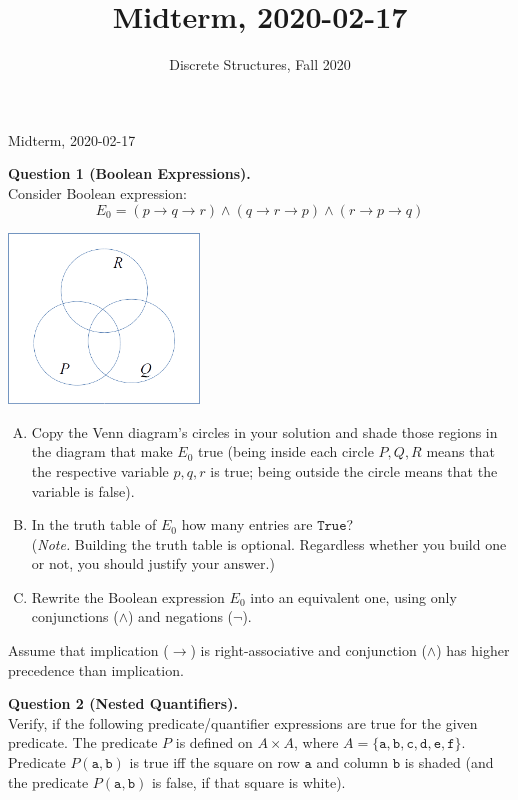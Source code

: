 \documentclass[jou]{apa6}
\title{Midterm, 2020-02-17}
\author{Discrete Structures, Fall 2020}
\affiliation{RBS}
\begin{document}
\thispagestyle{empty}

\twocolumn
{\Large Midterm, 2020-02-17}

\vspace{6pt}
{\bf Question 1 (Boolean Expressions).}\\
Consider Boolean expression:
$$E_0 = (p \rightarrow q \rightarrow r) \wedge (q \rightarrow r \rightarrow p) \wedge (r \rightarrow p \rightarrow q)$$
\begin{center}
\includegraphics[width=2in]{midterm/circles.png}
\end{center}

\begin{enumerate}[(A)]
\item Copy the Venn diagram's circles in your solution and shade those regions in the diagram that make $E_0$ true
(being inside each circle $P,Q,R$ means that the respective variable $p,q,r$ is true; being outside the circle means
that the variable is false). 
\item In the truth table of $E_0$ how many entries are $\mathtt{True}$?\\
({\em Note.} Building the truth table is optional. Regardless whether you build one or not, you should justify your answer.)
\item Rewrite the Boolean expression $E_0$ into an equivalent one, using 
only conjunctions ($\wedge$) and negations ($\neg$). 
\end{enumerate}

Assume that implication ($\rightarrow$) is right-associative 
and conjunction ($\wedge$) has higher precedence than implication. 



\vspace{10pt}
{\bf Question 2 (Nested Quantifiers).}\\
Verify, if the following predicate/quantifier expressions are true for the given predicate. 
The predicate $P$ is defined on $A \times A$, where
$A = \{ \mathtt{a},\mathtt{b},\mathtt{c},\mathtt{d},\mathtt{e},\mathtt{f} \}$. 
Predicate $P(\mathtt{a},\mathtt{b})$ is true iff the square on row $\mathtt{a}$
and column $\mathtt{b}$ is shaded (and the predicate $P(\mathtt{a},\mathtt{b})$ 
is false, if that square is white).
\end{document}
